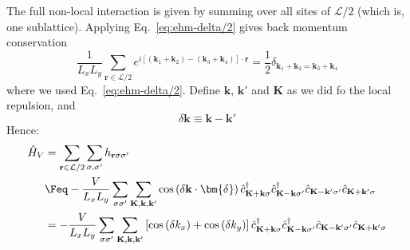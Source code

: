 The full non-local interaction is given by summing over all sites of $\mathcal{L}/2$ (which is, one sublattice). Applying Eq.~\eqref{eq:ehm-delta/2} gives back momentum conservation
\[
	\frac{1}{L_xL_y} \sum_{\mathbf{r} \in \mathcal{L}/2} e^{i \left[ (\mathbf{k}_1 + \mathbf{k}_2) - (\mathbf{k}_3 + \mathbf{k}_4) \right] \cdot \mathbf{r}} = \frac{1}{2} \delta_{\mathbf{k}_1 + \mathbf{k}_2 = \mathbf{k}_3 + \mathbf{k}_4}
\]
where we used Eq.~\eqref{eq:ehm-delta/2}. Define $\mathbf{k}$, $\mathbf{k}'$ and $\mathbf{K}$ as we did fo the local repulsion, and
\[
	\delta \mathbf{k} \equiv \mathbf{k}-\mathbf{k}'
\]
Hence:
\begin{align}
	\hat H_V &= \sum_{\mathbf{r} \in \mathcal{L}/2} \sum_{\sigma,\sigma'} h_{\mathbf{r}\sigma\sigma'} \nonumber \\
	&\Feq - \frac{V}{L_x L_y} \sum_{\sigma\sigma'} \sum_{\mathbf{K}, \mathbf{k}, \mathbf{k}'} \cos\left(
	\delta \mathbf{k} \cdot \bm{\delta}
	\right)	\hat c_{\mathbf{K}+\mathbf{k} \sigma}^\dagger \hat c_{\mathbf{K}-\mathbf{k} \sigma'}^\dagger \hat c_{\mathbf{K}-\mathbf{k}' \sigma'} \hat c_{\mathbf{K}+\mathbf{k}'\sigma} \nonumber \\
	&= - \frac{V}{L_x L_y} 	\sum_{\sigma\sigma'}
	\sum_{\mathbf{K}, \mathbf{k}, \mathbf{k}'} \left[
	\cos \left(
	\delta k_x
	\right)	+ \cos \left(
	\delta k_y
	\right)	
	\right]	\hat c_{\mathbf{K}+\mathbf{k} \sigma}^\dagger \hat c_{\mathbf{K}-\mathbf{k} \sigma'}^\dagger \hat c_{\mathbf{K}-\mathbf{k}' \sigma'} \hat c_{\mathbf{K}+\mathbf{k}'\sigma} \label{eq:HV-fourier}
\end{align}

